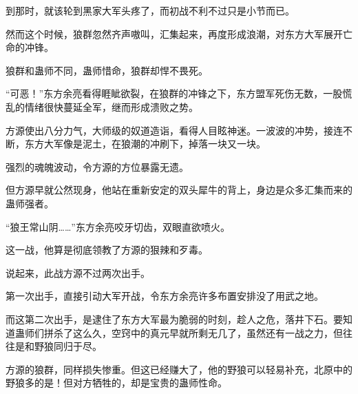 \begin{this_body}
到那时，就该轮到黑家大军头疼了，而初战不利不过只是小节而已。

然而这个时候，狼群忽然齐声嗷叫，汇集起来，再度形成浪潮，对东方大军展开亡命的冲锋。

狼群和蛊师不同，蛊师惜命，狼群却悍不畏死。

“可恶！”东方余亮看得睚眦欲裂，在狼群的冲锋之下，东方盟军死伤无数，一股慌乱的情绪很快蔓延全军，继而形成溃败之势。

方源使出八分力气，大师级的奴道造诣，看得人目眩神迷。一波波的冲势，接连不断，东方大军像是泥土，在狼潮的冲刷下，掉落一块又一块。

强烈的魂魄波动，令方源的方位暴露无遗。

但方源早就公然现身，他站在重新安定的双头犀牛的背上，身边是众多汇集而来的蛊师强者。

“狼王常山阴……”东方余亮咬牙切齿，双眼直欲喷火。

这一战，他算是彻底领教了方源的狠辣和歹毒。

说起来，此战方源不过两次出手。

第一次出手，直接引动大军开战，令东方余亮许多布置安排没了用武之地。

而这第二次出手，是逮住了东方大军最为脆弱的时刻，趁人之危，落井下石。要知道蛊师们拼杀了这么久，空窍中的真元早就所剩无几了，虽然还有一战之力，但往往是和野狼同归于尽。

方源的狼群，同样损失惨重。但这已经赚大了，他的野狼可以轻易补充，北原中的野狼多的是！但对方牺牲的，却是宝贵的蛊师性命。

\end{this_body}

